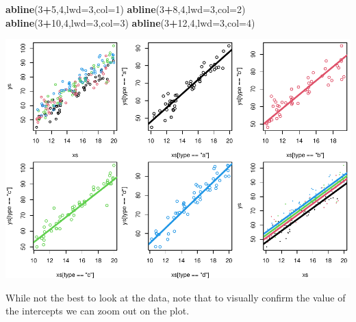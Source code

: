 \documentclass[
]{book}
\newenvironment{Shaded}{\begin{snugshade}}{\end{snugshade}}
\newcommand{\AttributeTok}[1]{\textcolor[rgb]{0.13,0.29,0.53}{#1}}
\newcommand{\DecValTok}[1]{\textcolor[rgb]{0.00,0.00,0.81}{#1}}
\newcommand{\FunctionTok}[1]{\textcolor[rgb]{0.13,0.29,0.53}{\textbf{#1}}}
\newcommand{\NormalTok}[1]{#1}
\newcommand{\SpecialCharTok}[1]{\textcolor[rgb]{0.81,0.36,0.00}{\textbf{#1}}}
\begin{document}
\begin{Shaded}
\begin{Highlighting}[]
\FunctionTok{abline}\NormalTok{(}\DecValTok{3}\SpecialCharTok{+}\DecValTok{5}\NormalTok{,}\DecValTok{4}\NormalTok{,}\AttributeTok{lwd=}\DecValTok{3}\NormalTok{,}\AttributeTok{col=}\DecValTok{1}\NormalTok{)}
\FunctionTok{abline}\NormalTok{(}\DecValTok{3}\SpecialCharTok{+}\DecValTok{8}\NormalTok{,}\DecValTok{4}\NormalTok{,}\AttributeTok{lwd=}\DecValTok{3}\NormalTok{,}\AttributeTok{col=}\DecValTok{2}\NormalTok{)}
\FunctionTok{abline}\NormalTok{(}\DecValTok{3}\SpecialCharTok{+}\DecValTok{10}\NormalTok{,}\DecValTok{4}\NormalTok{,}\AttributeTok{lwd=}\DecValTok{3}\NormalTok{,}\AttributeTok{col=}\DecValTok{3}\NormalTok{)}
\FunctionTok{abline}\NormalTok{(}\DecValTok{3}\SpecialCharTok{+}\DecValTok{12}\NormalTok{,}\DecValTok{4}\NormalTok{,}\AttributeTok{lwd=}\DecValTok{3}\NormalTok{,}\AttributeTok{col=}\DecValTok{4}\NormalTok{)}
\end{Highlighting}
\end{Shaded}

\includegraphics{ECOMODbook_files/figure-latex/a9.2-1.pdf}

While not the best to look at the data, note that to visually confirm the value of the intercepts we can zoom out on the plot.
\end{document}
